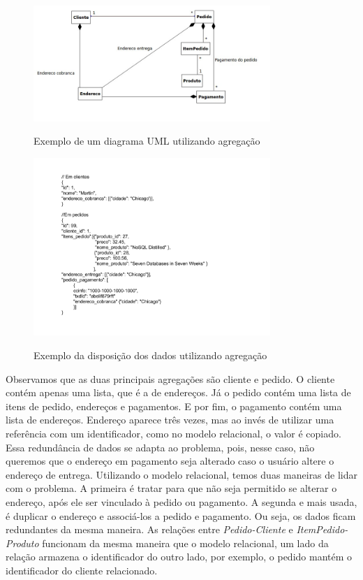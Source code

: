 \begin{figure}[H]
    \centering
    \caption{Exemplo de um diagrama \ac{UML} utilizando agregação}
    \includegraphics[width=0.8\textwidth]{./04-figuras/diagrama_no_sql_uml_simples.jpg}
    \label{fig:diagrama_no_sql_uml_simples}
\end{figure}
\begin{figure}[H]
    \centering
    \caption{Exemplo da disposição dos dados utilizando agregação}
    \includegraphics[width=0.8\textwidth]{./04-figuras/disposicao_json_simples.png}
    \label{fig:disposicao_json_simples}
\end{figure}



Observamos que as duas principais agregações são cliente e pedido. O cliente contém apenas uma lista, que é a de endereços. Já o pedido contém uma lista de itens de pedido, endereços e pagamentos. E por fim, o pagamento contém uma lista de endereços. Endereço aparece três vezes, mas ao invés de utilizar uma referência com um identificador, como no modelo relacional, o valor é copiado. Essa redundância de dados se adapta ao problema, pois, nesse caso, não queremos que o endereço em pagamento seja alterado caso o usuário altere o endereço de entrega.  Utilizando o modelo relacional, temos duas maneiras de lidar com o problema. A primeira é tratar para que não seja permitido se alterar o endereço, após ele ser vinculado à pedido ou pagamento. A segunda e mais usada, é duplicar o endereço e associá-los a pedido e pagamento. Ou seja, os dados ficam redundantes da mesma maneira. As relações entre \textit{Pedido-Cliente} e \textit{ItemPedido-Produto} funcionam da mesma maneira que o modelo relacional, um lado da relação armazena o identificador do outro lado, por exemplo, o pedido mantém o identificador do cliente relacionado.

